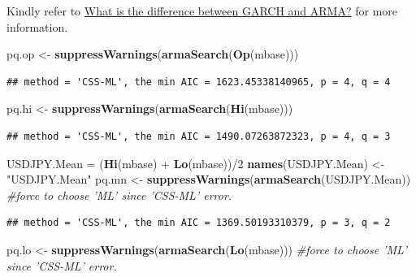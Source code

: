 \documentclass[]{tufte-book}
\newenvironment{Shaded}{}{}
\newcommand{\KeywordTok}[1]{\textcolor[rgb]{0.00,0.44,0.13}{\textbf{#1}}}
\newcommand{\DecValTok}[1]{\textcolor[rgb]{0.25,0.63,0.44}{#1}}
\newcommand{\StringTok}[1]{\textcolor[rgb]{0.25,0.44,0.63}{#1}}
\newcommand{\CommentTok}[1]{\textcolor[rgb]{0.38,0.63,0.69}{\textit{#1}}}
\newcommand{\OperatorTok}[1]{\textcolor[rgb]{0.40,0.40,0.40}{#1}}
\newcommand{\NormalTok}[1]{#1}
\begin{document}
Kindly refer to
\href{https://stats.stackexchange.com/questions/41509/what-is-the-difference-between-garch-and-arma}{{What
is the difference between GARCH and ARMA?}} for more information.

\begin{Shaded}
\begin{Highlighting}[]
\NormalTok{pq.op <-}\StringTok{ }\KeywordTok{suppressWarnings}\NormalTok{(}\KeywordTok{armaSearch}\NormalTok{(}\KeywordTok{Op}\NormalTok{(mbase)))}
\end{Highlighting}
\end{Shaded}

\begin{verbatim}
## method = 'CSS-ML', the min AIC = 1623.45338140965, p = 4, q = 4
\end{verbatim}

\begin{Shaded}
\begin{Highlighting}[]
\NormalTok{pq.hi <-}\StringTok{ }\KeywordTok{suppressWarnings}\NormalTok{(}\KeywordTok{armaSearch}\NormalTok{(}\KeywordTok{Hi}\NormalTok{(mbase)))}
\end{Highlighting}
\end{Shaded}

\begin{verbatim}
## method = 'CSS-ML', the min AIC = 1490.07263872323, p = 4, q = 3
\end{verbatim}

\begin{Shaded}
\begin{Highlighting}[]
\NormalTok{USDJPY.Mean =}\StringTok{ }\NormalTok{(}\KeywordTok{Hi}\NormalTok{(mbase) }\OperatorTok{+}\StringTok{ }\KeywordTok{Lo}\NormalTok{(mbase))}\OperatorTok{/}\DecValTok{2}
\KeywordTok{names}\NormalTok{(USDJPY.Mean) <-}\StringTok{ "USDJPY.Mean"}
\NormalTok{pq.mn <-}\StringTok{ }\KeywordTok{suppressWarnings}\NormalTok{(}\KeywordTok{armaSearch}\NormalTok{(USDJPY.Mean))  }\CommentTok{#force to choose 'ML' since 'CSS-ML' error.}
\end{Highlighting}
\end{Shaded}

\begin{verbatim}
## method = 'CSS-ML', the min AIC = 1369.50193310379, p = 3, q = 2
\end{verbatim}

\begin{Shaded}
\begin{Highlighting}[]
\NormalTok{pq.lo <-}\StringTok{ }\KeywordTok{suppressWarnings}\NormalTok{(}\KeywordTok{armaSearch}\NormalTok{(}\KeywordTok{Lo}\NormalTok{(mbase)))  }\CommentTok{#force to choose 'ML' since 'CSS-ML' error.}
\end{Highlighting}
\end{Shaded}
\end{document}
